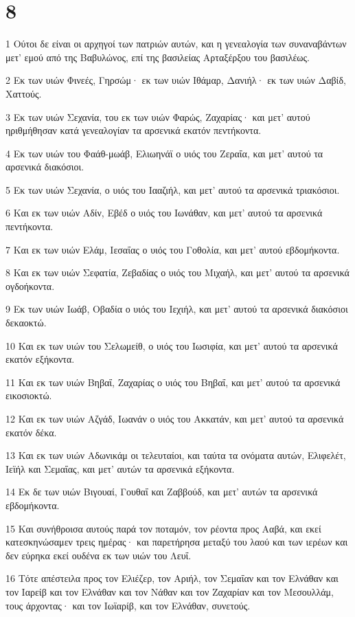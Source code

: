 \chapter{8}

\par 1 Ούτοι δε είναι οι αρχηγοί των πατριών αυτών, και η γενεαλογία των συναναβάντων μετ' εμού από της Βαβυλώνος, επί της βασιλείας Αρταξέρξου του βασιλέως.
\par 2 Εκ των υιών Φινεές, Γηρσώμ· εκ των υιών Ιθάμαρ, Δανιήλ· εκ των υιών Δαβίδ, Χαττούς.
\par 3 Εκ των υιών Σεχανία, του εκ των υιών Φαρώς, Ζαχαρίας· και μετ' αυτού ηριθμήθησαν κατά γενεαλογίαν τα αρσενικά εκατόν πεντήκοντα.
\par 4 Εκ των υιών του Φαάθ-μωάβ, Ελιωηνάϊ ο υιός του Ζεραΐα, και μετ' αυτού τα αρσενικά διακόσιοι.
\par 5 Εκ των υιών Σεχανία, ο υιός του Ιααζιήλ, και μετ' αυτού τα αρσενικά τριακόσιοι.
\par 6 Και εκ των υιών Αδίν, Εβέδ ο υιός του Ιωνάθαν, και μετ' αυτού τα αρσενικά πεντήκοντα.
\par 7 Και εκ των υιών Ελάμ, Ιεσαΐας ο υιός του Γοθολία, και μετ' αυτού εβδομήκοντα.
\par 8 Και εκ των υιών Σεφατία, Ζεβαδίας ο υιός του Μιχαήλ, και μετ' αυτού τα αρσενικά ογδοήκοντα.
\par 9 Εκ των υιών Ιωάβ, Οβαδία ο υιός του Ιεχιήλ, και μετ' αυτού τα αρσενικά διακόσιοι δεκαοκτώ.
\par 10 Και εκ των υιών του Σελωμείθ, ο υιός του Ιωσιφία, και μετ' αυτού τα αρσενικά εκατόν εξήκοντα.
\par 11 Και εκ των υιών Βηβαΐ, Ζαχαρίας ο υιός του Βηβαΐ, και μετ' αυτού τα αρσενικά εικοσιοκτώ.
\par 12 Και εκ των υιών Αζγάδ, Ιωανάν ο υιός του Ακκατάν, και μετ' αυτού τα αρσενικά εκατόν δέκα.
\par 13 Και εκ των υιών Αδωνικάμ οι τελευταίοι, και ταύτα τα ονόματα αυτών, Ελιφελέτ, Ιεϊήλ και Σεμαΐας, και μετ' αυτών τα αρσενικά εξήκοντα.
\par 14 Εκ δε των υιών Βιγουαί, Γουθαΐ και Ζαββούδ, και μετ' αυτών τα αρσενικά εβδομήκοντα.
\par 15 Και συνήθροισα αυτούς παρά τον ποταμόν, τον ρέοντα προς Ααβά, και εκεί κατεσκηνώσαμεν τρεις ημέρας· και παρετήρησα μεταξύ του λαού και των ιερέων και δεν εύρηκα εκεί ουδένα εκ των υιών του Λευΐ.
\par 16 Τότε απέστειλα προς τον Ελιέζερ, τον Αριήλ, τον Σεμαΐαν και τον Ελνάθαν και τον Ιαρείβ και τον Ελνάθαν και τον Νάθαν και τον Ζαχαρίαν και τον Μεσουλλάμ, τους άρχοντας· και τον Ιωϊαρίβ, και τον Ελνάθαν, συνετούς.
